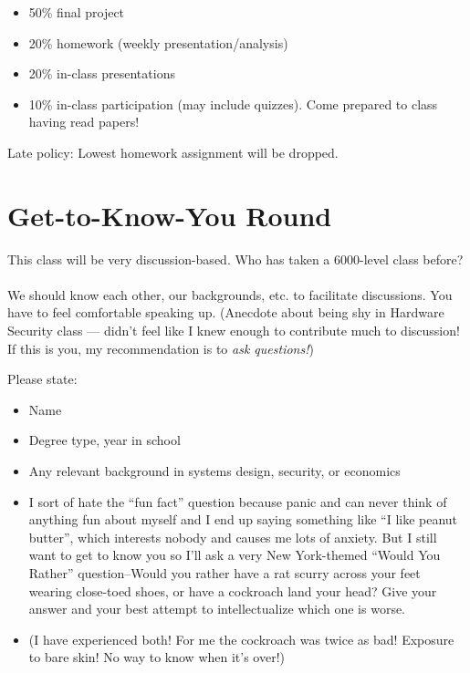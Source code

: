 \documentclass[11pt]{article}
\begin{document}
\begin{itemize}
    \item 50\% final project 
    \item 20\% homework (weekly presentation/analysis)
    \item 20\% in-class presentations
    \item 10\% in-class participation (may include quizzes). Come prepared to class having read papers! 
\end{itemize}

Late policy: Lowest homework assignment will be dropped. 

\section{Get-to-Know-You Round}

This class will be very discussion-based. Who has taken a 6000-level class before?
\\ \\ 
We should know each other, our backgrounds, etc. to facilitate discussions. You have to feel comfortable speaking up. (Anecdote about being shy in Hardware Security class --- didn't feel like I knew enough to contribute much to discussion! If this is you, my recommendation is to {\it ask questions!})

Please state:

\begin{itemize}
    \item Name
    \item Degree type, year in school
    \item Any relevant background in systems design, security, or economics
    \item I sort of hate the ``fun fact'' question because panic and can never think of anything fun about myself and I end up saying something like ``I like peanut butter'', which interests nobody and causes me lots of anxiety. 
    But I still want to get to know you so I'll ask a very New York-themed ``Would You Rather'' question--Would you rather have a rat scurry across your feet wearing close-toed shoes, or have a cockroach land your head? Give your answer and your best attempt to intellectualize which one is worse. 
    \item (I have experienced both! For me the cockroach was twice as bad! Exposure to bare skin! No way to know when it's over!)
\end{itemize}
\end{document}
